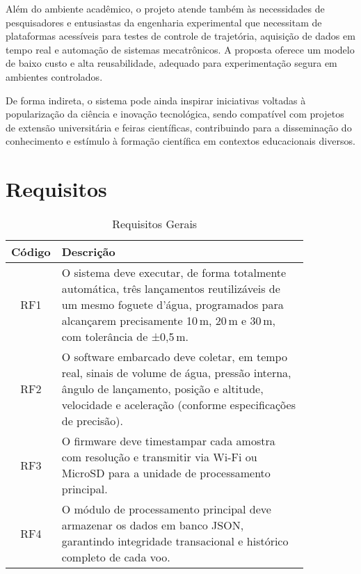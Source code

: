 Além do ambiente acadêmico, o projeto atende também às necessidades de pesquisadores e entusiastas da engenharia experimental que necessitam de plataformas acessíveis para testes de controle de trajetória, aquisição de dados em tempo real e automação de sistemas mecatrônicos. A proposta oferece um modelo de baixo custo e alta reusabilidade, adequado para experimentação segura em ambientes controlados.

De forma indireta, o sistema pode ainda inspirar iniciativas voltadas à popularização da ciência e inovação tecnológica, sendo compatível com projetos de extensão universitária e feiras científicas, contribuindo para a disseminação do conhecimento e estímulo à formação científica em contextos educacionais diversos.

\section{Requisitos}

\begin{table}[htpb]
\centering
\scriptsize
\setlength{\tabcolsep}{4pt}
\caption{Requisitos Gerais}
\begin{tabular}{|c|p{0.85\linewidth}|}
\hline
\textbf{Código} & \textbf{Descrição} \\
\hline
RF1 & O sistema deve executar, de forma totalmente automática, três lançamentos reutilizáveis de um mesmo foguete d'água, programados para alcançarem precisamente 10\,m, 20\,m e 30\,m, com tolerância de ±0,5\,m. \\
\hline
RF2 & O software embarcado deve coletar, em tempo real, sinais de volume de água, pressão interna, ângulo de lançamento, posição e altitude, velocidade e aceleração (conforme especificações de precisão). \\
\hline
RF3 & O firmware deve timestampar cada amostra com resolução e transmitir via Wi-Fi ou MicroSD para a unidade de processamento principal. \\
\hline
RF4 & O módulo de processamento principal deve armazenar os dados em banco JSON, garantindo integridade transacional e histórico completo de cada voo. \\
\hline
\end{tabular}
\label{tab:requisitos-funcionais}
\end{table}


